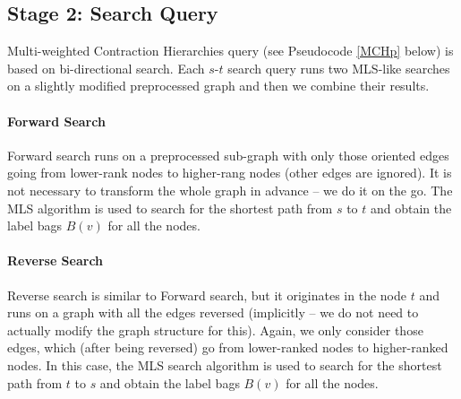
\subsection{Stage 2: Search Query}
\label{subsecStage2}

Multi-weighted Contraction Hierarchies query (see Pseudocode \ref{MCHp} below) is based on bi-directional search.
Each $s$-$t$ search query runs two MLS-like searches on a slightly modified preprocessed graph
and then we combine their results. 

\paragraph*{Forward Search}
Forward search runs on a preprocessed sub-graph with only those oriented edges going from 
lower-rank nodes to higher-rang nodes
(other edges are ignored). It is not necessary to transform the whole graph in advance -- we do it on the go. 
The MLS algorithm is used to search for the shortest path from $s$ to $t$ and obtain the label bags $B(v)$ for all the nodes.


\paragraph*{Reverse Search}
Reverse search is similar to Forward search, but it originates in the node $t$ and runs on a graph with all the edges reversed (implicitly -- we do not need to actually modify the graph structure for this). Again, we only consider those edges, which (after being reversed) go from lower-ranked nodes to higher-ranked nodes. 
In this case, the MLS search algorithm is used to search for the shortest path from $t$ to $s$ and obtain the label bags $B(v)$ for all the nodes.

